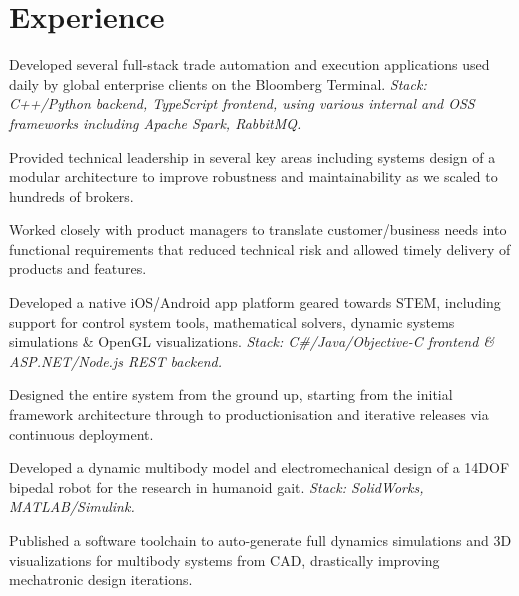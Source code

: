 \section{Experience}

\label{sub:fulltime}
{
\begin{tightitemize}
	\item Developed several full-stack trade automation and execution applications used daily by global enterprise clients on the Bloomberg Terminal. \textit{Stack: C++/Python backend, TypeScript frontend, using various internal and OSS frameworks including Apache Spark, RabbitMQ.}
	\item Provided technical leadership in several key areas including systems design of a modular architecture to improve robustness and maintainability as we scaled to hundreds of brokers.
	\item Worked closely with product managers to translate customer/business needs into functional requirements that reduced technical risk and allowed timely delivery of products and features.
\end{tightitemize}
}

\label{sub:fulltime}
{
\begin{tightitemize}
	\item Developed a native iOS/Android app platform geared towards STEM, including support for control system tools, mathematical solvers, dynamic systems simulations \& OpenGL visualizations. \textit{Stack: C\#/Java/Objective-C frontend \& ASP.NET/Node.js REST backend.}
	\item Designed the entire system from the ground up, starting from the initial framework architecture through to productionisation and iterative releases via continuous deployment.
\end{tightitemize}
}


\label{sub:postgrad}
{
\begin{tightitemize}
	\item Developed a dynamic multibody model and electromechanical design of a 14DOF bipedal robot for the research in humanoid gait. \textit{Stack: SolidWorks, MATLAB/Simulink.}
	\item Published a software toolchain to auto-generate full dynamics simulations and 3D visualizations for multibody systems from CAD, drastically improving mechatronic design iterations.
\end{tightitemize}
}

